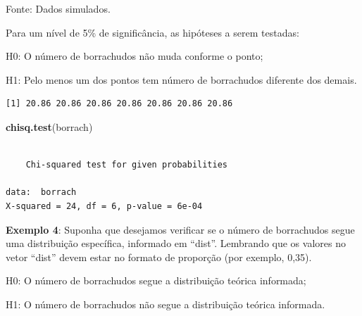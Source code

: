 \documentclass[12pt,brazil,oneside]{book}
\newenvironment{Shaded}{\begin{snugshade}}{\end{snugshade}}
\newcommand{\DecValTok}[1]{\textcolor[rgb]{0.00,0.00,0.81}{#1}}
\newcommand{\FloatTok}[1]{\textcolor[rgb]{0.00,0.00,0.81}{#1}}
\newcommand{\KeywordTok}[1]{\textcolor[rgb]{0.13,0.29,0.53}{\textbf{#1}}}
\newcommand{\NormalTok}[1]{#1}
\newcommand{\OperatorTok}[1]{\textcolor[rgb]{0.81,0.36,0.00}{\textbf{#1}}}
\begin{document}
Fonte: Dados simulados.

Para um nível de 5\% de significância, as hipóteses a serem testadas:

H0: O número de borrachudos não muda conforme o ponto;

H1: Pelo menos um dos pontos tem número de borrachudos diferente dos
demais.

\begin{Shaded}
\end{Shaded}

\begin{verbatim}
[1] 20.86 20.86 20.86 20.86 20.86 20.86 20.86
\end{verbatim}

\begin{Shaded}
\begin{Highlighting}[]
\KeywordTok{chisq.test}\NormalTok{(borrach)}
\end{Highlighting}
\end{Shaded}

\begin{verbatim}

    Chi-squared test for given probabilities

data:  borrach
X-squared = 24, df = 6, p-value = 6e-04
\end{verbatim}

\textbf{Exemplo 4}: Suponha que desejamos verificar se o número de
borrachudos segue uma distribuição específica, informado em ``dist''.
Lembrando que os valores no vetor ``dist'' devem estar no formato de
proporção (por exemplo, 0,35).

H0: O número de borrachudos segue a distribuição teórica informada;

H1: O número de borrachudos não segue a distribuição teórica informada.

\begin{Shaded}
\end{Shaded}
\end{document}
